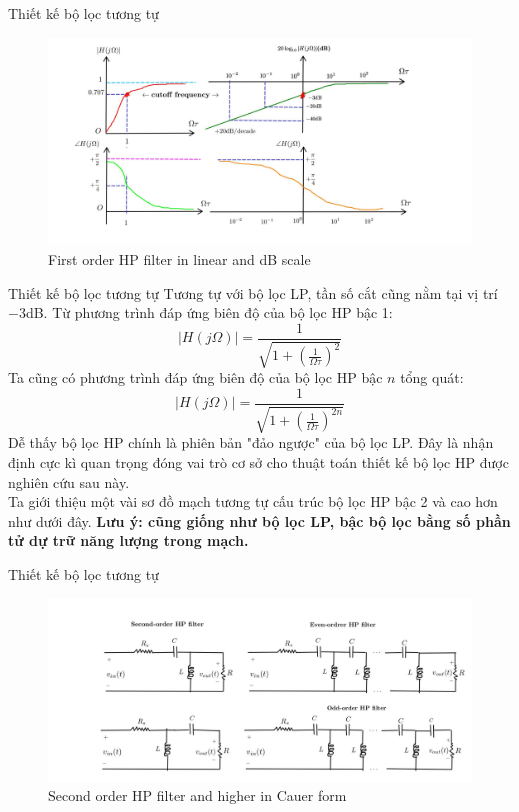 \documentclass[8pt]{beamer}
\begin{document}
\begin{frame}{Thiết kế bộ lọc tương tự}
\begin{figure}[h]
			\includegraphics[width=1.1\textwidth]{7.jpg}
			\caption{First order HP filter in linear and dB scale}			\label{fig:re2}
		\end{figure}

\end{frame}
\begin{frame}{Thiết kế bộ lọc tương tự}
Tương tự với bộ lọc LP, tần số cắt cũng nằm tại vị trí $-3$dB. Từ phương trình đáp ứng biên độ của bộ lọc HP bậc 1:  $$|H(j\Omega)|=\frac{1}{\sqrt{1+\left(\frac{1}{\Omega\tau}\right)^{2}}}$$
Ta cũng có phương trình đáp ứng biên độ của bộ lọc HP bậc $n$ tổng quát:
$$|H(j\Omega)|=\frac{1}{\sqrt{1+\left(\frac{1}{\Omega\tau}\right)^{2n}}}$$
Dễ thấy bộ lọc HP \alert{chính là phiên bản "đảo ngược"} của bộ lọc LP. Đây là nhận định cực kì quan trọng đóng vai trò cơ sở cho thuật toán thiết kế bộ lọc HP được nghiên cứu sau này.
\\ Ta giới thiệu một vài sơ đồ mạch tương tự cấu trúc bộ lọc HP bậc 2 và cao hơn như dưới đây. \textbf{Lưu ý: cũng giống như bộ lọc LP, bậc bộ lọc bằng số phần tử dự trữ năng lượng trong mạch.}
\end{frame}
\begin{frame}{Thiết kế bộ lọc tương tự}
\begin{figure}[h]
			\includegraphics[width=1.1\textwidth]{8.jpg}
			\caption{Second order HP filter and higher in Cauer form}			\label{fig:re2}
		\end{figure}


\end{frame}
\end{document}

